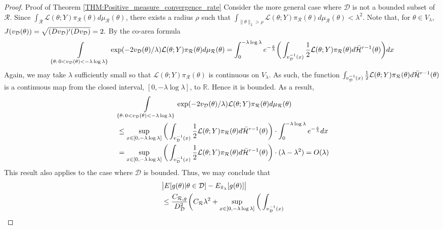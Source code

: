 \documentclass[10pt,fleqn]{article} \pdfoutput=1
\DeclareMathOperator{\1}{\mathbbm{1}} \DeclareMathOperator{\bigO}{\mc O}
\begin{document}
\begin{proof}{Proof of Theorem \ref{THM:Positive_measure_convergence_rate}}
	Consider the more general case where $\mathcal{D}$ is not a bounded subset
	of $\mathcal{R}.$ Since
	$\int_\mathcal{R}\mathcal{L}(\theta;Y)\pi_\mathcal{R}(\theta)d\mu_\mathcal{R}(\theta)$,
	there exists a radius $\rho$ such that $\int_{\|\theta\|_2 >
			\rho}\mathcal{L}(\theta;Y)\pi_\mathcal{R}(\theta)d\mu_\mathcal{R}(\theta)<
		\lambda^2.$  Note that, for $\theta \in V_\lambda$,
	$J(v_{\mathcal{D}}(\theta))=\sqrt{(Dv_{\mathcal{D}})'(Dv_{\mathcal{D}})} = 2.$ By the co-area formula
	\cite{diaconis2013manifold,federer2014geometric} $$\int\limits_{\{\theta:
			\, 0< v_{\mathcal{D}}(\theta)< -\lambda\log\lambda\}}\exp(-2v_{\mathcal{D}}(\theta)/\lambda
		)\mathcal{L}(\theta;Y)\pi_\mathcal{R}(\theta) d\mu_\mathcal{R}(\theta)  =
		\int_0^{-\lambda\log\lambda} e^{-\frac{x}{\lambda}}\bigg(
		\int_{v_{\mathcal{D}}^{-1}(x)} \frac{1}{2}\mathcal{L}(\theta;Y) \pi_\mathcal{R}(\theta)
		d\bar{\mathcal{H}}^{r-1}(\theta)\bigg) dx$$ Again, we may take $\lambda$
	sufficiently small so that $\mathcal{L}(\theta;Y) \pi_\mathcal{R}(\theta) $
	is continuous on $V_\lambda.$  As such, the function $ \int_{v_{\mathcal{D}}^{-1}(x)}
		\frac{1}{2}\mathcal{L}(\theta;Y) \pi_\mathcal{R}(\theta)
		d\bar{\mathcal{H}}^{r-1}(\theta)$ is a continuous map from the closed
	interval, $[0,-\lambda\log\lambda]$, to $\mathbb{R}.$ Hence it is bounded.
	As a result, \begin{align*}  & \int\limits_{\{\theta: \, 0< v_{\mathcal{D}}(\theta)<
			-\lambda\log\lambda\}}\exp(-2v_{\mathcal{D}}(\theta)/\lambda
		)\mathcal{L}(\theta;Y)\pi_\mathcal{R}(\theta)
		d\mu_\mathcal{R}(\theta)                     \\ &\le \sup_{x \in
			[0,-\lambda\log\lambda]} \bigg( \int_{v_{\mathcal{D}}^{-1}(x)}
		\frac{1}{2}\mathcal{L}(\theta;Y) \pi_\mathcal{R}(\theta)
		d\bar{\mathcal{H}}^{r-1}(\theta)\bigg) \cdot \int_0^{-\lambda\log \lambda}
		e^{-\frac{x}{\lambda}}dx                     \\ & = \sup_{x \in [0,-\lambda\log\lambda]} \bigg(
		\int_{v_{\mathcal{D}}^{-1}(x)} \frac{1}{2}\mathcal{L}(\theta;Y) \pi_\mathcal{R}(\theta)
		d\bar{\mathcal{H}}^{r-1}(\theta)\bigg)  \cdot (\lambda - \lambda^2) =
		O(\lambda)\end{align*} This result also applies to the case where
	$\mathcal{D}$ is bounded.  Thus, we may conclude that \begin{align*}  & \big|
		E[g(\theta)|\theta\in\mathcal{D}]-E_{\tilde{\pi}_\lambda}[g(\theta)]\big| \\
		 & \le
		\frac{C_{\mathcal{R},g}}{D_\mathcal{D}^2}\bigg(C_\mathcal{R}\lambda^2
		+ \sup_{x \in [0,-\lambda\log\lambda]} \bigg( \int_{v_{\mc D}^{-1}(x)}

\end{align*}
\end{proof}
\end{document}
